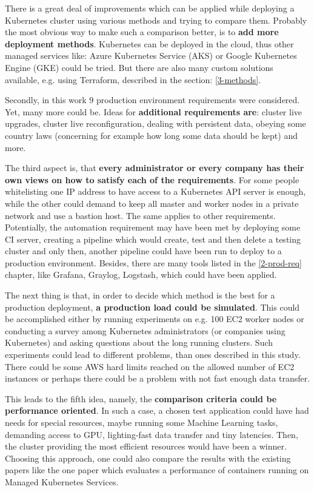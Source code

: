 There is a great deal of improvements which can be applied while deploying a Kubernetes cluster using various methods and trying to compare them. Probably the most obvious way to make such a comparison better, is to \textbf{add more deployment methods}. Kubernetes can be deployed in the cloud, thus other managed services like: Azure Kubernetes Service (AKS) or Google Kubernetes Engine (GKE) could be tried. But there are also many custom solutions available, e.g. using Terraform, described in the section: \ref{3-methods}.

Secondly, in this work 9 production environment requirements were considered. Yet, many more could be. Ideas for \textbf{additional requirements are}: cluster live upgrades, cluster live reconfiguration, dealing with persistent data, obeying some country laws (concerning for example how long some data should be kept) and more.

The third aspect is, that \textbf{every administrator or every company has their own views on how to satisfy each of the requirements}. For some people whitelisting one IP address to have access to a Kubernetes API server is enough, while the other could demand to keep all master and worker nodes in a private network and use a bastion host. The same applies to other requirements. Potentially, the automation requirement may have been met by deploying some CI server, creating a pipeline which would create, test and then delete a testing cluster and only then, another pipeline could have been run to deploy to a production environment. Besides, there are many tools listed in the \ref{2-prod-req} chapter, like Grafana, Graylog, Logstash, which could have been applied.

The next thing is that, in order to decide which method is the best for a production deployment, \textbf{a production load could be simulated}. This could be accomplished either by running experiments on e.g. 100 EC2 worker nodes or conducting a survey among Kubernetes administrators (or companies using Kubernetes) and asking questions about the long running clusters. Such experiments could lead to different problems, than ones described in this study. There could be some AWS hard limits reached on the allowed number of EC2 instances or perhaps there could be a problem with not fast enough data transfer.

This leads to the fifth idea, namely, the \textbf{comparison criteria could be performance oriented}. In such a case, a chosen test application could have had needs for special resources, maybe running some Machine Learning tasks, demanding access to GPU, lighting-fast data transfer and tiny latencies. Then, the cluster providing the most efficient resources would have been a winner. Choosing this approach, one could also compare the results with the existing papers like the one paper which evaluates a performance of containers running on Managed Kubernetes Services\cite{article-managed}.

